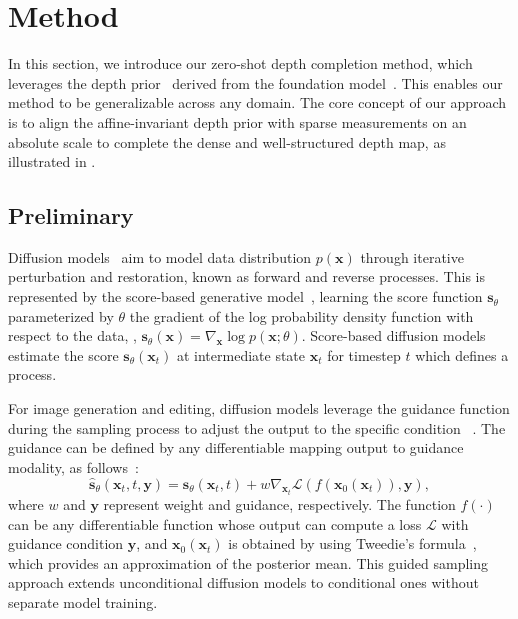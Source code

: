 
\section{Method}
In this section, we introduce our zero-shot depth completion method, which leverages the depth prior~\cite{ke2023repurposing, gui2024depthfm}
derived from the foundation model~\cite{rombach2022highresolution}. This 
enables our method to be generalizable across any domain.
The core concept of our approach is to align the affine-invariant depth prior with sparse measurements on an absolute scale to complete the dense and well-structured depth map, as illustrated in .

\subsection{Preliminary}
\label{sec:preliminary}
Diffusion models~\cite{ho2020denoising, song2022denoising} aim to model data distribution $p(\mathbf{x})$ through iterative perturbation and restoration, known as forward and reverse processes.
This is represented by the score-based generative model~\cite{song2021scorebased}, learning the score function $\mathbf{s}_\theta$ parameterized by $\theta$ the gradient of the log probability density function with respect to the data, \ie, $\mathbf{s}_\theta(\mathbf{x}) =\nabla_{\mathbf{x}} \log p(\mathbf{x};\theta)$.
Score-based diffusion models 
estimate the score $\mathbf{s}_\theta(\mathbf{x}_t)$ at intermediate state $\mathbf{x}_t$ for timestep $t$ which defines a process.

For image generation and editing, diffusion models leverage the guidance function during the sampling process to adjust the output to the specific condition
~\cite{ho2022classifierfree, dhariwal2021diffusion}.
The guidance can be 
defined 
by any differentiable mapping output to guidance modality, as follows~\cite{bansal2024universal}: 
\begin{equation}
\label{eq:guide_sampling}
\hat{\mathbf{s}}_{\theta}(\mathbf{x}_t, t, \mathbf{y}) = \mathbf{s}_{\theta}(\mathbf{x}_t, t) + w \nabla_{\mathbf{x}_t} \mathcal{L}\left(f\left(\mathbf{x}_0\left(\mathbf{x}_t\right)\right),\mathbf{y}\right),
\end{equation}
where $w$ and $\mathbf{y}$ represent weight and guidance, respectively.
The function $f(\cdot)$ can be any differentiable function whose output can compute a loss $\mathcal{L}$ with guidance condition $\mathbf{y}$, and
$\mathbf{x}_0\left(\mathbf{x}_t\right)$ is obtained by using Tweedie's formula~\cite{efron2011tweedie}, 
which provides an approximation of the posterior mean. 
This guided sampling approach extends unconditional diffusion models to conditional ones without separate model training.

